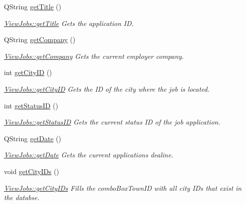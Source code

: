 \begin{DoxyCompactItemize}
Q\+String \hyperlink{class_view_jobs_ae78f119d37c77a9e3e457ecfd78d7de3}{get\+Title} ()
\begin{DoxyCompactList}\small\item\em \hyperlink{class_view_jobs_ae78f119d37c77a9e3e457ecfd78d7de3}{View\+Jobs\+::get\+Title} Gets the application ID. \end{DoxyCompactList}\item 
Q\+String \hyperlink{class_view_jobs_a88d7c0a7a79bc7a7e02b524587983bf8}{get\+Company} ()
\begin{DoxyCompactList}\small\item\em \hyperlink{class_view_jobs_a88d7c0a7a79bc7a7e02b524587983bf8}{View\+Jobs\+::get\+Company} Gets the current employer company. \end{DoxyCompactList}\item 
int \hyperlink{class_view_jobs_adcafeca350b21a033aa630e042ee7947}{get\+City\+ID} ()
\begin{DoxyCompactList}\small\item\em \hyperlink{class_view_jobs_adcafeca350b21a033aa630e042ee7947}{View\+Jobs\+::get\+City\+ID} Gets the ID of the city where the job is located. \end{DoxyCompactList}\item 
int \hyperlink{class_view_jobs_a91696fde9f0a663bae929390aac8324b}{get\+Status\+ID} ()
\begin{DoxyCompactList}\small\item\em \hyperlink{class_view_jobs_a91696fde9f0a663bae929390aac8324b}{View\+Jobs\+::get\+Status\+ID} Gets the current status ID of the job application. \end{DoxyCompactList}\item 
Q\+String \hyperlink{class_view_jobs_af046f9201cc6031e070b4f9b613a35f9}{get\+Date} ()
\begin{DoxyCompactList}\small\item\em \hyperlink{class_view_jobs_af046f9201cc6031e070b4f9b613a35f9}{View\+Jobs\+::get\+Date} Gets the current application\textquotesingle{}s dealine. \end{DoxyCompactList}\item 
\mbox{\label{class_view_jobs_a6cf031afcc4a09dfca54044fdf8c4f7b}} 
void \hyperlink{class_view_jobs_a6cf031afcc4a09dfca54044fdf8c4f7b}{get\+City\+I\+Ds} ()
\begin{DoxyCompactList}\small\item\em \hyperlink{class_view_jobs_a6cf031afcc4a09dfca54044fdf8c4f7b}{View\+Jobs\+::get\+City\+I\+Ds} Fills the combo\+Box\+Town\+ID with all city I\+Ds that exist in the databse. \end{DoxyCompactList}\item 

\end{DoxyCompactItemize}
